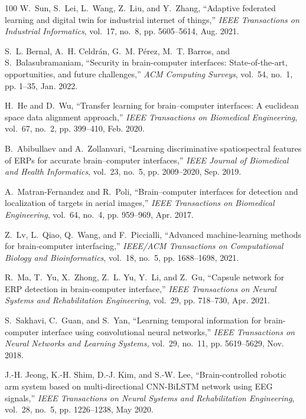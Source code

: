 \documentclass[journal]{IEEEtran}
\begin{document}
\begin{thebibliography}{100}
	W.~Sun, S.~Lei, L.~Wang, Z.~Liu, and Y.~Zhang, ``Adaptive federated learning
	and digital twin for industrial internet of things,'' \emph{IEEE Transactions
		on Industrial Informatics}, vol.~17, no.~8, pp. 5605--5614, Aug. 2021.
	
	S.~L. Bernal, A.~H. Celdr{\'a}n, G.~M. P{\'e}rez, M.~T. Barros, and
	S.~Balasubramaniam, ``Security in brain-computer interfaces:
	State-of-the-art, opportunities, and future challenges,'' \emph{ACM Computing
		Surveys}, vol.~54, no.~1, pp. 1--35, Jan. 2022.
	
	H.~He and D.~Wu, ``Transfer learning for brain–computer interfaces: A
	euclidean space data alignment approach,'' \emph{IEEE Transactions on
		Biomedical Engineering}, vol.~67, no.~2, pp. 399--410, Feb. 2020.
	
	B.~Abibullaev and A.~Zollanvari, ``Learning discriminative spatiospectral
	features of {ERPs} for accurate brain–computer interfaces,'' \emph{IEEE
		Journal of Biomedical and Health Informatics}, vol.~23, no.~5, pp.
	2009--2020, Sep. 2019.
	
	A.~Matran-Fernandez and R.~Poli, ``Brain–computer interfaces for detection
	and localization of targets in aerial images,'' \emph{IEEE Transactions on
		Biomedical Engineering}, vol.~64, no.~4, pp. 959--969, Apr. 2017.
	
	Z.~Lv, L.~Qiao, Q.~Wang, and F.~Piccialli, ``Advanced machine-learning methods
	for brain-computer interfacing,'' \emph{IEEE/ACM Transactions on
		Computational Biology and Bioinformatics}, vol.~18, no.~5, pp. 1688--1698,
	2021.
	
	R.~Ma, T.~Yu, X.~Zhong, Z.~L. Yu, Y.~Li, and Z.~Gu, ``Capsule network for {ERP}
	detection in brain-computer interface,'' \emph{IEEE Transactions on Neural
		Systems and Rehabilitation Engineering}, vol.~29, pp. 718--730, Apr. 2021.
	
	S.~Sakhavi, C.~Guan, and S.~Yan, ``Learning temporal information for
	brain-computer interface using convolutional neural networks,'' \emph{IEEE
		Transactions on Neural Networks and Learning Systems}, vol.~29, no.~11, pp.
	5619--5629, Nov. 2018.
	
	J.-H. Jeong, K.-H. Shim, D.-J. Kim, and S.-W. Lee, ``Brain-controlled robotic
	arm system based on multi-directional {CNN-BiLSTM} network using {EEG}
	signals,'' \emph{IEEE Transactions on Neural Systems and Rehabilitation
		Engineering}, vol.~28, no.~5, pp. 1226--1238, May 2020.
	

\end{thebibliography}
\end{document}
